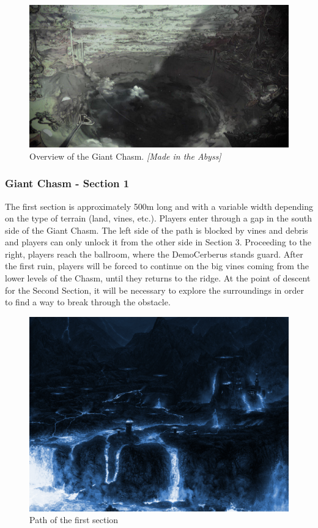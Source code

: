 \begin{figure}[H]
	\centering
	\includegraphics[width=0.8\linewidth]{images/visual_ref/15_giant_chasm/chasm_outside.jpg}
	\caption*{Overview of the Giant Chasm. \textit{[Made in the Abyss]}}
\end{figure}
\newpage


\subsubsection{Giant Chasm - Section 1}
The first section is approximately 500m long and with a variable width depending on the type of terrain (land, vines, etc.). Players enter through a gap in the south side of the Giant Chasm. The left side of the path is blocked by vines and debris and players can only unlock it from the other side in Section 3. Proceeding to the right, players reach the ballroom, where the DemoCerberus stands guard. After the first ruin, players will be forced to continue on the big vines coming from the lower levels of the Chasm, until they returns to the ridge. At the point of descent for the Second Section, it will be necessary to explore the surroundings in order to find a way to break through the obstacle.

\vspace*{0.3cm}
\begin{figure}[H]
	\centering
	\includegraphics[width=0.7\linewidth]{images/visual_ref/15_giant_chasm/chasm_section_1.png}
	\caption*{Path of the first section}
\end{figure}


